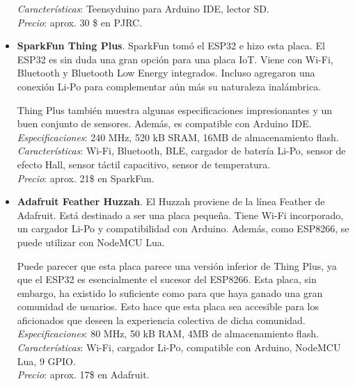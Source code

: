 \documentclass[12pt]{article}
\begin{document}
\begin{itemize}
		\textit{Características}: Teensyduino para Arduino IDE, lector SD. \\
		
		\textit{Precio}: aprox. 30 \$ en PJRC. \\
		
		\item \textbf{SparkFun Thing Plus}. SparkFun tomó el ESP32 e hizo esta placa. El ESP32 es sin duda una gran opción para una placa IoT. Viene con Wi-Fi, Bluetooth y Bluetooth Low Energy integrados. Incluso agregaron una conexión Li-Po para complementar aún más su naturaleza inalámbrica.
		
		Thing Plus también muestra algunas especificaciones impresionantes y un buen conjunto de sensores. Además, es compatible con Arduino IDE. \\
		
		\textit{Especificaciones}: 240 MHz, 520 kB SRAM, 16MB de almacenamiento flash. \\
		
		\textit{Características}: Wi-Fi, Bluetooth, BLE, cargador de batería Li-Po, sensor de efecto Hall, sensor táctil capacitivo, sensor de temperatura. \\
		
		\textit{Precio}: aprox. 21\$ en SparkFun.\\
		
		\item \textbf{Adafruit Feather Huzzah}. El Huzzah proviene de la línea Feather de Adafruit. Está destinado a ser una placa pequeña. Tiene Wi-Fi incorporado, un cargador Li-Po y compatibilidad con Arduino. Además, como ESP8266, se puede utilizar con NodeMCU Lua.
		
		Puede parecer que esta placa parece una versión inferior de Thing Plus, ya que el ESP32 es esencialmente el sucesor del ESP8266. Esta placa, sin embargo, ha existido lo suficiente como para que haya ganado una gran comunidad de usuarios. Esto hace que esta placa sea accesible para los aficionados que deseen la experiencia colectiva de dicha comunidad. \\
		
		\textit{Especificaciones}: 80 MHz, 50 kB RAM, 4MB de almacenamiento flash. \\
		
		\textit{Características}: Wi-Fi, cargador Li-Po, compatible con Arduino, NodeMCU Lua, 9 GPIO.\\
		
		\textit{Precio}: aprox. 17\$ en Adafruit.\\
		

\end{itemize}
\end{document}
